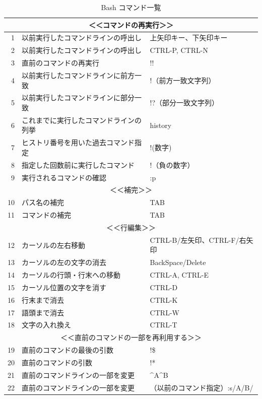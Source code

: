 \documentclass[mingoth,a4paper]{jsarticle}
\begin{document}
\begin{table}[h]
\begin{center}
 \scriptsize
\caption{Bash コマンド一覧}
\begin{tabular}{|r|l|l|}
\hline
\multicolumn{3}{|c|}{＜＜コマンドの再実行＞＞}\\ \hline
1 & 以前実行したコマンドラインの呼出し &  上矢印キー、下矢印キー \\ \hline
2 & 以前実行したコマンドラインの呼出し & CTRL-P, CTRL-N \\ \hline
3 & 直前のコマンドの再実行 & !! \\ \hline
4 & 以前実行したコマンドラインに前方一致 & !（前方一致文字列） \\ \hline
5 & 以前実行したコマンドラインに部分一致 & !?（部分一致文字列） \\ \hline
6 & これまでに実行したコマンドラインの列挙 & history \\ \hline
7 & ヒストリ番号を用いた過去コマンド指定 & !(数字) \\ \hline
8 & 指定した回数前に実行したコマンド & !（負の数字） \\ \hline
9 & 実行されるコマンドの確認 & :p \\ \hline
\multicolumn{3}{|c|}{＜＜補完＞＞}\\ \hline
10 & パス名の補完 & TAB \\ \hline
11 & コマンドの補完 & TAB \\ \hline
\multicolumn{3}{|c|}{＜＜行編集＞＞}\\ \hline
12 & カーソルの左右移動 & CTRL-B/左矢印、CTRL-F/右矢印 \\ \hline
13 & カーソルの左の文字の消去 & BackSpace/Delete \\ \hline
14 & カーソルの行頭・行末への移動 & CTRL-A, CTRL-E \\ \hline
15 & カーソル位置の文字を消す & CTRL-D \\ \hline
16 & 行末まで消去 & CTRL-K \\ \hline
17 & 語頭まで消去 & CTRL-W \\ \hline
18 & 文字の入れ換え & CTRL-T \\ \hline
\multicolumn{3}{|c|}{＜＜直前のコマンドの一部を再利用する＞＞}\\ \hline
19 & 直前のコマンドの最後の引数 & !\$ \\ \hline
20 & 直前のコマンドの引数 & !* \\ \hline
21 & 直前のコマンドラインの一部を変更 & \^{ }A\^{ }B \\ \hline
22 & 直前のコマンドラインの一部を変更 & （以前のコマンド指定）:s/A/B/ \\ \hline

\end{tabular}
\end{center}
\end{table}
\end{document}
